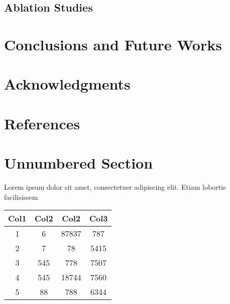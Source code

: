 \documentclass[12pt]{article}
\begin{document}
    \subsection{Ablation Studies}

\section{Conclusions and Future Works}
\section{Acknowledgments}
\section{References}



            






        




        




\section{Unnumbered Section}
Lorem ipsum dolor sit amet, consectetuer adipiscing elit.  
Etiam lobortis facilisissem

\begin{center}
 \begin{tabular}{||c c c c||} 
 \hline
 Col1 & Col2 & Col2 & Col3 \\ [0.5ex] 
 \hline\hline
 1 & 6 & 87837 & 787 \\ 
 \hline
 2 & 7 & 78 & 5415 \\
 \hline
 3 & 545 & 778 & 7507 \\
 \hline
 4 & 545 & 18744 & 7560 \\
 \hline
 5 & 88 & 788 & 6344 \\ [1ex] 
 \hline
\end{tabular}
\end{center}
\end{document}
